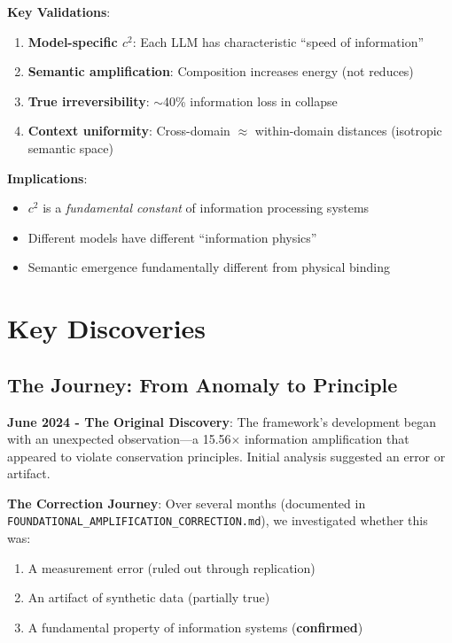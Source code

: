 \documentclass[11pt,a4paper]{article}
\begin{document}
\textbf{Key Validations}:
\begin{enumerate}
    \item \textbf{Model-specific $c^2$}: Each LLM has characteristic ``speed of information''
    \item \textbf{Semantic amplification}: Composition increases energy (not reduces)
    \item \textbf{True irreversibility}: $\sim$40\% information loss in collapse
    \item \textbf{Context uniformity}: Cross-domain $\approx$ within-domain distances (isotropic semantic space)
\end{enumerate}

\textbf{Implications}: 
\begin{itemize}
    \item $c^2$ is a \emph{fundamental constant} of information processing systems
    \item Different models have different ``information physics''
    \item Semantic emergence fundamentally different from physical binding
\end{itemize}

\section{Key Discoveries}

\subsection{The Journey: From Anomaly to Principle}

\textbf{June 2024 - The Original Discovery}: The framework's development began with an unexpected observation---a 15.56$\times$ information amplification that appeared to violate conservation principles. Initial analysis suggested an error or artifact.

\textbf{The Correction Journey}: Over several months (documented in \texttt{FOUNDATIONAL\_AMPLIFICATION\_CORRECTION.md}), we investigated whether this was:
\begin{enumerate}
    \item A measurement error (ruled out through replication)
    \item An artifact of synthetic data (partially true)
    \item A fundamental property of information systems (\textbf{confirmed})
\end{enumerate}
\end{document}
